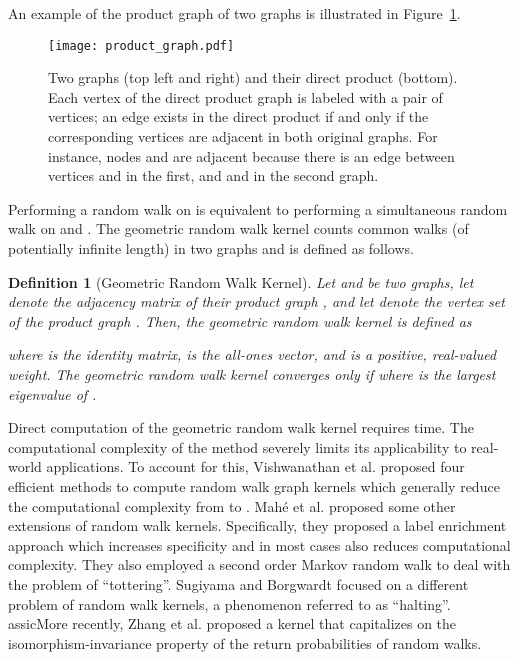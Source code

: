 \documentclass[twoside,11pt]{article}
\newtheorem{definition}{Definition}
\begin{document}
An example of the product graph of two graphs is illustrated in Figure~\ref{fig:product_graph}.
\begin{figure}[t]
    \centering
    \texttt{[image: product\_graph.pdf]}
    \caption{Two graphs (top left and right) and their direct product (bottom). Each vertex of the direct product graph is labeled with a pair of vertices; an edge exists in the direct product if and only if the corresponding vertices are adjacent in both original graphs. For instance, nodes  and  are adjacent because there is an edge between vertices  and  in the first, and  and  in the second graph.}
    \label{fig:product_graph}
\end{figure}
Performing a random walk on  is equivalent to performing a simultaneous random walk on  and .
The geometric random walk kernel counts common walks (of potentially infinite length) in two graphs and is defined as follows.  
\begin{definition}[Geometric Random Walk Kernel]
  Let  and  be two graphs, let  denote the adjacency matrix of their product graph , and let  denote the vertex set of the product graph .
  Then, the geometric random walk kernel is defined as
  
  where  is the identity matrix,  is the all-ones vector, and  is a positive, real-valued weight.
  The geometric random walk kernel converges only if  where  is the largest eigenvalue of .
\end{definition}
Direct computation of the geometric random walk kernel requires  time.
The computational complexity of the method severely limits its applicability to real-world applications.
To account for this, Vishwanathan et al. \citeyear{vishwanathan2010graph} proposed four efficient methods to compute random walk graph kernels which generally reduce the computational complexity from  to .
Mah{\'e} et al. \citeyear{mahe2004extensions} proposed some other extensions of random walk kernels.
Specifically, they proposed a label enrichment approach which increases specificity and in most cases also reduces computational complexity.
They also employed a second order Markov random walk to deal with the problem of ``tottering''.
Sugiyama and Borgwardt \citeyear{sugiyama2015halting} focused on a different problem of random walk kernels, a phenomenon referred to as ``halting''.
assicMore recently, Zhang et al. \citeyear{zhang2018retgk} proposed a kernel that capitalizes on the isomorphism-invariance property of the return probabilities of random walks.
\end{document}
